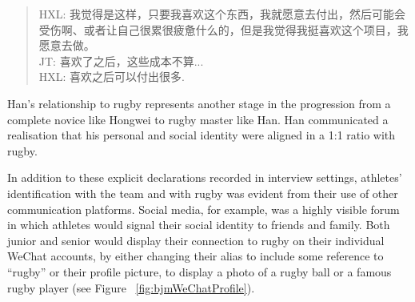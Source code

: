 \begin{CJK}{UTF8}{gbsn}
          \begin{quote}
            HXL: 我觉得是这样，只要我喜欢这个东西，我就愿意去付出，然后可能会受伤啊、或者让自己很累很疲惫什么的，但是我觉得我挺喜欢这个项目，我愿意去做。\\
            JT: 喜欢了之后，这些成本不算...\\
            HXL: 喜欢之后可以付出很多.
          \end{quote}
Han's relationship to rugby represents another stage in the progression from a complete novice like Hongwei to rugby master like Han.  Han communicated a realisation that his personal and social identity were aligned in a 1:1 ratio with rugby.

In addition to these explicit declarations recorded in interview settings, athletes' identification with the team and with rugby was evident from their use of other communication platforms.  Social media, for example, was a highly visible forum in which athletes would signal their social identity to friends and family.  Both junior and senior would display their connection to rugby on their individual WeChat accounts, by either changing their alias to include some reference to ``rugby'' or their profile picture, to display a photo of a rugby ball or a famous rugby player (see Figure ~\ref{fig:bjmWeChatProfile}).


\end{CJK}
